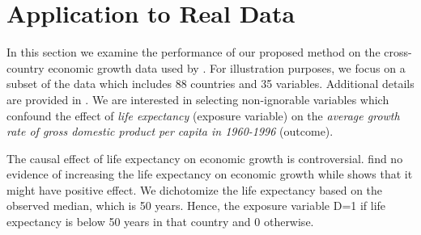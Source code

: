 \documentclass[11pt]{statsoc}
\begin{document}
\section{Application to Real Data } \label{sec:application}

In this section we examine the performance of our proposed method on the cross-country economic growth data used by \cite{doppelhofer2003determinants}. For   illustration purposes, we focus on a subset of the data which includes 88 countries and 35 variables. Additional details are provided in \cite{doppelhofer2009jointness}. We are interested in selecting non-ignorable variables which confound the effect of {\it life expectancy} (exposure variable) on the {\it average growth rate of gross domestic product per capita in 1960-1996} (outcome). 

The causal effect of life expectancy on economic growth is controversial. \cite{acemoglu2006disease} find no evidence of increasing the life expectancy on economic growth while \cite{husain2012alternative} shows that it might have positive effect. We dichotomize the life expectancy based on the observed median, which is 50 years.  Hence, the exposure  variable D=1 if life expectancy is below 50 years in that country and 0 otherwise. 
\end{document}
